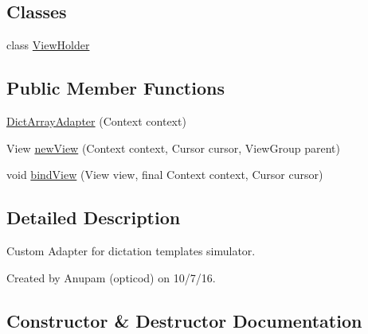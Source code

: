 \subsection*{Classes}
\begin{DoxyCompactItemize}
\item 
class \hyperlink{classorg_1_1buildmlearn_1_1toolkit_1_1dictationtemplate_1_1adapter_1_1DictArrayAdapter_1_1ViewHolder}{View\+Holder}
\end{DoxyCompactItemize}
\subsection*{Public Member Functions}
\begin{DoxyCompactItemize}
\item 
\hyperlink{classorg_1_1buildmlearn_1_1toolkit_1_1dictationtemplate_1_1adapter_1_1DictArrayAdapter_a874b53062d3470547ef9fed7bb189959}{Dict\+Array\+Adapter} (Context context)
\item 
View \hyperlink{classorg_1_1buildmlearn_1_1toolkit_1_1dictationtemplate_1_1adapter_1_1DictArrayAdapter_a02ca27c0cacfbbf59511d8d3cb3ca49b}{new\+View} (Context context, Cursor cursor, View\+Group parent)
\item 
void \hyperlink{classorg_1_1buildmlearn_1_1toolkit_1_1dictationtemplate_1_1adapter_1_1DictArrayAdapter_a2c4b5da39cd79aa9fc7bb89855a7ee9a}{bind\+View} (View view, final Context context, Cursor cursor)
\end{DoxyCompactItemize}


\subsection{Detailed Description}
Custom Adapter for dictation template\textquotesingle{}s simulator. 

Created by Anupam (opticod) on 10/7/16. 

\subsection{Constructor \& Destructor Documentation}
